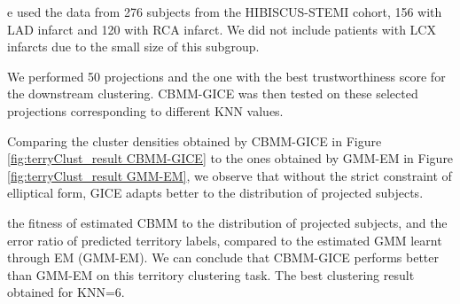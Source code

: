 e used the data from 276 subjects from the HIBISCUS-STEMI cohort, 156 with LAD infarct and 120 with RCA infarct. We did not include patients with LCX infarcts due to the small size of this subgroup.

 We performed 50 projections and the one with the best trustworthiness score  for the downstream clustering. CBMM-GICE was then tested on these selected projections corresponding to different KNN values.

 Comparing the cluster densities obtained by CBMM-GICE in Figure \ref{fig:terryClust_result CBMM-GICE} to the ones obtained by GMM-EM in Figure \ref{fig:terryClust_result GMM-EM}, we observe that without the strict constraint of elliptical form, GICE adapts better to the distribution of projected subjects.

 the fitness of estimated CBMM to the distribution of projected subjects, and the error ratio of predicted territory labels, compared to the estimated GMM learnt through EM (GMM-EM). We can conclude that CBMM-GICE performs better than GMM-EM on this territory clustering task. The best clustering result  obtained for KNN=6. 

